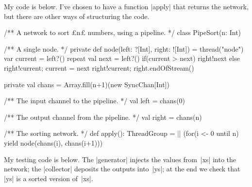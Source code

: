 \begin{answerI}
My code is below.  I've chosen to have a function |apply| that returns the
network, but there are other ways of structuring the code. 
%
\begin{scala}
/** A network to sort £n£ numbers, using a pipeline. */
class PipeSort(n: Int){
  /** A single node. */
  private def node(left: ?[Int], right: ![Int]) = thread("node"){
    var current = left?()
    repeat{
      val next = left?()
      if(current > next) right!next
      else { right!current; current = next }
    }
    right!current; right.endOfStream()
  }

  private val chans = Array.fill(n+1)(new SyncChan[Int])

  /** The input channel to the pipeline. */
  val left = chans(0)

  /** The output channel from the pipeline. */
  val right = chans(n)

  /** The sorting network. */
  def apply(): ThreadGroup =
    || (for(i <- 0 until n) yield node(chans(i), chans(i+1)))
}
\end{scala}

My testing code is below.  The |generator| injects the values from~|xs| into
the network; the |collector| deposits the outputs into~|ys|; at the end we
check that |ys| is a sorted version of~|xs|.  
%


\end{answerI}
